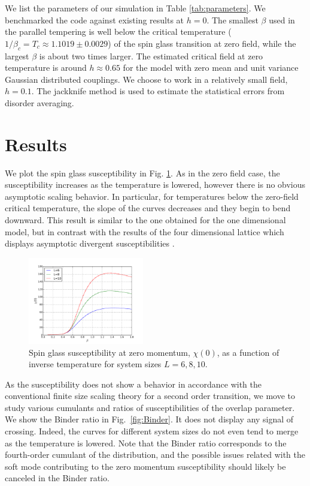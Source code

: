 \documentclass[aps,prb,twocolumn,showpacs,superscriptaddress]{revtex4}
\begin{document}
We list the parameters of our simulation in Table \ref{tab:parameters}. We 
benchmarked the code against existing results at $h=0$.  The smallest 
$\beta$ used in the parallel tempering is well below the critical temperature ($1/\beta_{c} = T_{c} \approx 1.1019 \pm 0.0029$) \cite{Baity-Jesi-etal-2013} of 
the spin glass transition at zero field\cite{Ballesteros2000,Baity-Jesi-etal-2013}, while the largest $\beta$ 
is about two times larger.  The estimated critical field at zero temperature is around $h \approx 0.65$ for 
the model with zero mean and unit variance Gaussian distributed couplings\cite{Krzakala-etal-2001}. 
We choose to work in a relatively small field, $h=0.1$. 
The jackknife method is used to estimate the statistical errors from disorder averaging. 



\section{Results} 
We plot the spin glass susceptibility in Fig. \ref{fig:Chi}. As in the 
zero field case, the susceptibility increases as the temperature is lowered, however there is
no obvious asymptotic scaling behavior. In particular, for temperatures below  
the zero-field critical temperature, the
slope of the curves decreases and they begin to bend downward. This result is similar to the one obtained for
the one dimensional model\cite{Larson-etal-2013}, but in contrast with the results of the four dimensional lattice 
which displays asymptotic divergent susceptibilities \cite{Marinari-etal-1998}.

\begin{figure}[ht]
  \includegraphics[width=0.45\textwidth]{img/chi.pdf}%
  \caption{\label{fig:Chi} Spin glass susceptibility at zero momentum, $\chi(0)$, as a function of inverse temperature 
for system sizes $L=6,8,10$.}
\end{figure}


As the susceptibility does not show a behavior in accordance with the conventional 
finite size scaling theory for a second order transition, we move to study various 
cumulants and ratios of susceptibilities of the overlap parameter. We show the Binder ratio in Fig.~\ref{fig:Binder}. It does not display any signal of crossing. 
Indeed, the curves for different system sizes do not even tend to merge as the temperature 
is lowered.  Note that the Binder ratio corresponds to the fourth-order cumulant of the 
distribution, and 
the possible issues related with the soft mode  
contributing to the zero momentum susceptibility should likely be canceled in the Binder ratio.
\end{document}

